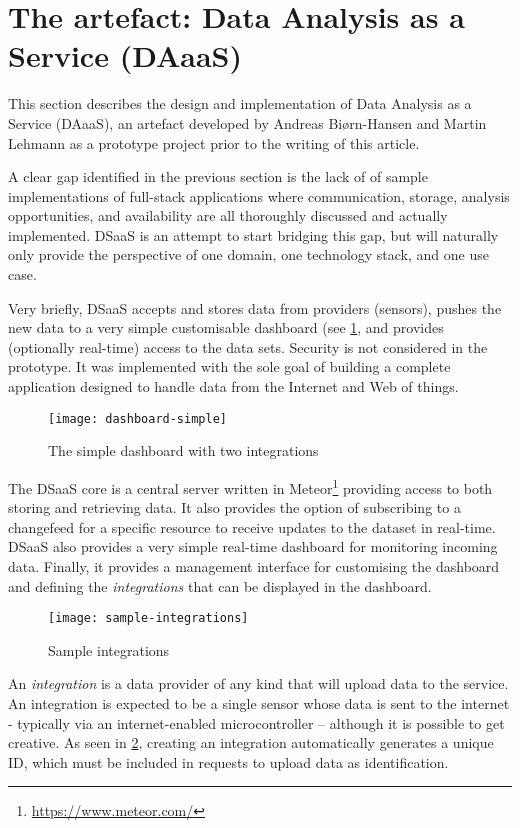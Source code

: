 \section{The artefact: Data Analysis as a Service (DAaaS)}
This section describes the design and implementation of Data Analysis as a Service (DAaaS), an artefact developed by Andreas Biørn-Hansen and Martin Lehmann as a prototype project prior to the writing of this article.

A clear gap identified in the previous section is the lack of of sample implementations of full-stack applications where communication, storage, analysis opportunities, and availability are all thoroughly discussed and actually implemented. DSaaS is an attempt to start bridging this gap, but will naturally only provide the perspective of one domain, one technology stack, and one use case.

Very briefly, DSaaS accepts and stores data from providers (sensors), pushes the new data to a very simple customisable dashboard (see \ref{fig:simple-dashboard}, and provides (optionally real-time) access to the data sets. Security is not considered in the prototype. It was implemented with the sole goal of building a complete application designed to handle data from the Internet and Web of things.

\begin{figure}[H]
    \label{fig:simple-dashboard}
    \centerline{\texttt{[image: dashboard-simple]}}
    \caption{The simple dashboard with two integrations}
\end{figure}

The DSaaS core is a central server written in Meteor\footnote{\url{https://www.meteor.com/}} providing access to both storing and retrieving data. It also provides the option of subscribing to a changefeed for a specific resource to receive updates to the dataset in real-time. DSaaS also provides a very simple real-time dashboard for monitoring incoming data. Finally, it provides a management interface for customising the dashboard and defining the \textit{integrations} that can be displayed in the dashboard.

\begin{figure}[H]
    \label{fig:sample-integrations}
    \centerline{\texttt{[image: sample-integrations]}}
    \caption{Sample integrations}
\end{figure}

An \textit{integration} is a data provider of any kind that will upload data to the service. An integration is expected to be a single sensor whose data is sent to the internet - typically via an internet-enabled microcontroller -- although it is possible to get creative. As seen in \ref{fig:sample-integrations}, creating an integration automatically generates a unique ID, which must be included in requests to upload data as identification.

